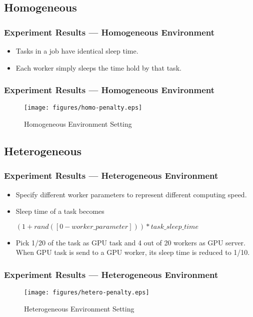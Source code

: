 \subsection{Homogeneous}
\begin{frame}
  \frametitle{Experiment Results --- Homogeneous Environment}
  \begin{itemize}
    \item Tasks in a job have identical sleep time.
    \item Each worker simply sleeps the time hold by that task.
  \end{itemize}
\end{frame}

\begin{frame}
  \frametitle{Experiment Results --- Homogeneous Environment}
  \begin{figure}[htbp]
    \centering
    \texttt{[image: figures/homo-penalty.eps]}
    \caption{Homogeneous Environment Setting}
    \label{fig:homo-exp}
  \end{figure}
\end{frame}

\subsection{Heterogeneous}
\begin{frame}
  \frametitle{Experiment Results --- Heterogeneous Environment}
  \begin{itemize}
    \item Specify different worker parameters to represent different
      computing speed.
    \item Sleep time of a task becomes
      \begin{center}
        \begin{minipage}{.8\textwidth}
          \begin{exampleblock}{}
            \centering
            $\left(1 + rand([0-worker\_parameter])\right)*task\_sleep\_time$
          \end{exampleblock}
        \end{minipage}
      \end{center}
    \item Pick 1/20 of the task as GPU task and 4 out of 20 workers as
      GPU server.  When GPU task is send to a GPU worker, its sleep
      time is reduced to 1/10.
  \end{itemize}
\end{frame}

\begin{frame}
  \frametitle{Experiment Results --- Heterogeneous Environment}
  \begin{figure}[htbp]
    \centering
    \texttt{[image: figures/hetero-penalty.eps]}
    \caption{Heterogeneous Environment Setting}
    \label{fig:hetero-exp}
  \end{figure}
\end{frame}

